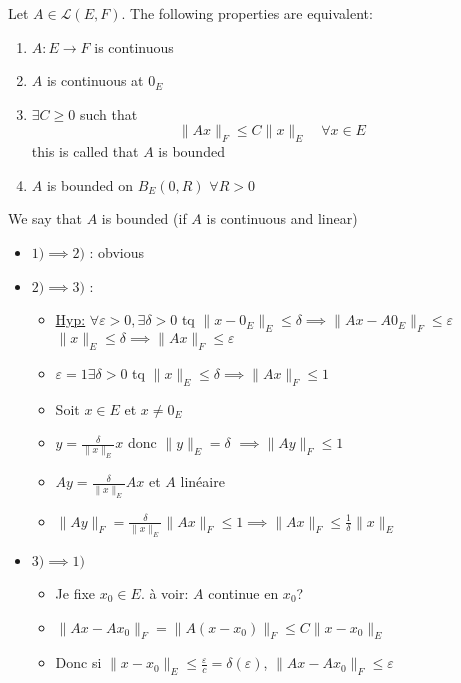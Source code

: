 \begin{theorem}
    Let $A \in \mathcal{L}(E, F)$. The following properties are equivalent:
    \begin{enumerate}
        \item $A: E \to F$ is continuous
        \item $A$ is continuous at $0_E$
        \item  $\exists C \ge 0$ such that 
            \[
            \|Ax\|_F \le C\|x\|_E \quad \forall x \in E
            \] 
            this is called that $A$ is bounded
        \item $A$ is bounded on $B_E(0, R)$ $\forall R > 0$
    \end{enumerate}
    We say that $A$ is bounded (if $A$ is continuous and linear)
\end{theorem}
\begin{preuve}
    \begin{itemize}
        \item $1) \implies 2)$ : obvious
        \item $2) \implies 3)$ : 
            \begin{itemize}
                \item 
                    \underline{Hyp:} $\forall \varepsilon >0, \exists \delta > 0$ tq $\|x - 0_E\|_E \le \delta \implies \|Ax - A0_E\|_F \le \varepsilon$ $\|x\|_E \le \delta \implies \|Ax\|_F \le \varepsilon$
                \item $\varepsilon = 1 \exists \delta > 0$ tq $\|x\|_E \le \delta \implies \|Ax\|_F \le 1$
                \item Soit $ x \in E$ et $x \neq 0_E$
                \item $y = \frac{\delta}{\|x\|_E}x$ donc $\|y\|_E = \delta$  $\implies\|Ay\|_F \le 1$
                \item $Ay = \frac{\delta}{\|x\|_{E}}Ax$ et $A$ linéaire
                \item  $\|Ay\|_{F} = \frac{\delta}{\|x\|_E}\|Ax\|_F \le 1 \implies \|Ax\|_F \le \frac{1}{\delta}\|x\|_E$
            \end{itemize}
        \item $3) \implies 1)$ 
            \begin{itemize}
                \item Je fixe $x_0 \in E$. à voir: $A$ continue en  $x_0$?
                \item $\|Ax - Ax_0\|_F = \|A(x - x_0)\|_F \le C\|x - x_0\|_E$
                \item Donc si $\|x - x_0\|_E \le \frac{\varepsilon}{c} = \delta(\varepsilon)$, $\|Ax - Ax_0\|_F \le \varepsilon$
            \end{itemize}
    \end{itemize}
\end{preuve}

